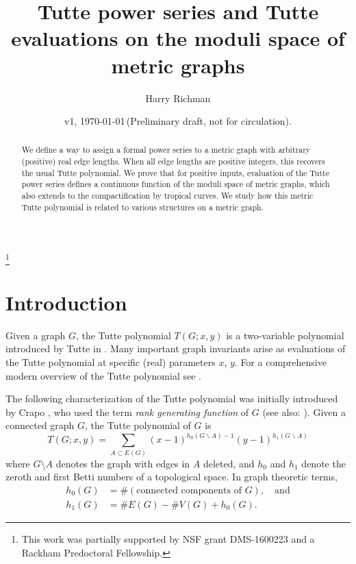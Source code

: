 \documentclass{amsart}
\theoremstyle{definition}
\begin{document}
\title[Tutte power series on metric graphs]{Tutte power series and Tutte evaluations on the moduli space of metric graphs}
\author{Harry Richman}
\date{v1, \today  \,(Preliminary draft, not for circulation).}
\thanks{This work was partially supported by NSF grant DMS-1600223
and a Rackham Predoctoral Fellowship.}


\begin{abstract}
We define a way to assign a formal power series to a metric graph with arbitrary
(positive) real edge lengths.
When all edge lengths are positive integers,
this recovers the usual Tutte polynomial.
We prove that for positive inputs, evaluation of the Tutte power series
defines a continuous function of the moduli space of metric graphs,
which also extends to the compactification by tropical curves.
We study how this metric Tutte polynomial is
related to various structures on a metric graph.
\end{abstract}
\maketitle


\section{Introduction}
Given a graph $G$,
the Tutte polynomial $T(G;x,y)$ 
is 
 a two-variable polynomial %
introduced by Tutte in \cite{Tut}.
Many important graph invariants arise as evaluations of 
the Tutte polynomial %
at specific (real) parameters $x$, $y$.
For a comprehensive modern overview of the Tutte polynomial see \cite{BO} \cite{EMM}.

The following characterization of the Tutte polynomial was initially introduced by Crapo \cite{Cra}, who used the term {\em rank generating function} of $G$
(see also: \cite[Definition 3]{EMM}).
Given a connected graph $G $, 
the Tutte polynomial of $G$ is 
\begin{equation}
\label{eq:tutte-graph}
T(G; x,y) = \sum_{A \subset E(G)} (x-1)^{h_0(G\backslash A) - 1}(y-1)^{h_1(G\backslash A)}
\end{equation}
where $G\setminus A$ denotes the graph with edges in $A$ deleted,
and $h_0$ and $h_1$ denote the zeroth and first Betti numbers of 
a topological space.
In graph theoretic terms,
\begin{align*}
h_0(G) &= \#(\text{connected components of }G), \quad\text{and}\\
h_1(G) &= \# E(G) - \# V(G) + h_0(G) .
\end{align*}
\end{document}
